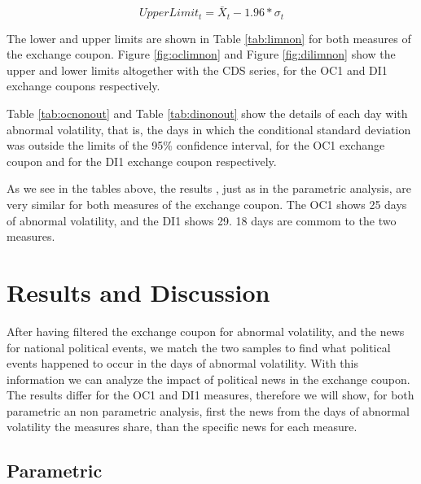\documentclass[cic,tc, english]{iiufrgs}
\begin{document}
    \begin{equation}
        \label{eqn:lonp}
        UpperLimit_t = \bar{X}_t - 1.96 * \sigma_t
    \end{equation}

    The lower and upper limits are shown in Table \ref{tab:limnon} for both measures of the exchange coupon. Figure \ref{fig:oclimnon} and Figure \ref{fig:dilimnon} show the upper and lower limits altogether with the CDS series, for the OC1 and DI1 exchange coupons respectively.

    

    

    

    Table \ref{tab:ocnonout} and Table \ref{tab:dinonout} show the details of each day with abnormal volatility, that is, the days in which the conditional standard deviation was outside the limits of the 95\% confidence interval, for the OC1 exchange coupon and for the DI1 exchange coupon respectively.

    

    

    As we see in the tables above, the results , just as in the parametric analysis, are very similar for both measures of the exchange coupon. The OC1 shows 25 days of abnormal volatility, and the DI1 shows 29. 18 days are commom to the two measures.

\chapter{Results and Discussion} \label{chapter_results_discussion}

    After having filtered the exchange coupon for abnormal volatility, and the news for national political events, we match the two samples to find what political events happened to occur in the days of abnormal volatility. With this information we can analyze the impact of political news in the exchange coupon. The results differ for the OC1 and DI1 measures, therefore we will show, for both parametric an non parametric analysis, first the news from the days of abnormal volatility the measures share, than the specific news for each measure.

\section{Parametric}
\end{document}
